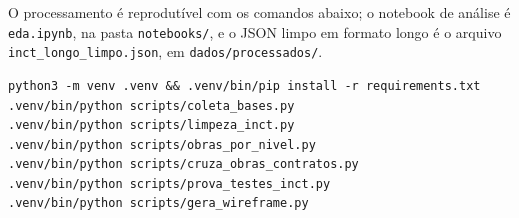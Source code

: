 \documentclass[11pt,a4paper]{article}
\newcommand{\campo}[1]{\texttt{#1}}
\begin{document}
O processamento é reprodutível com os comandos abaixo; o notebook de análise é \campo{eda.ipynb}, na pasta \campo{notebooks/}, e o JSON limpo em formato longo é o arquivo \campo{inct\_longo\_limpo.json}, em \campo{dados/processados/}.

\begin{verbatim}
python3 -m venv .venv && .venv/bin/pip install -r requirements.txt
.venv/bin/python scripts/coleta_bases.py
.venv/bin/python scripts/limpeza_inct.py
.venv/bin/python scripts/obras_por_nivel.py
.venv/bin/python scripts/cruza_obras_contratos.py
.venv/bin/python scripts/prova_testes_inct.py
.venv/bin/python scripts/gera_wireframe.py
\end{verbatim}
\end{document}
